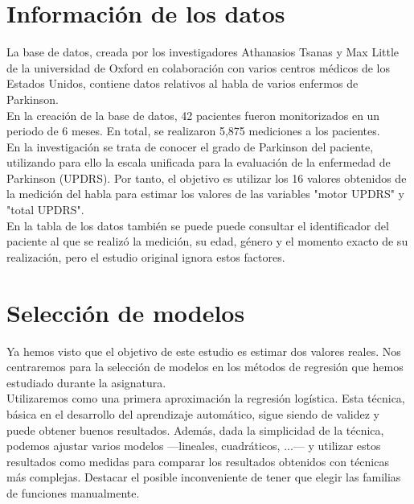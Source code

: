\section{Información de los datos}

La base de datos, creada por los investigadores Athanasios Tsanas y Max Little de la universidad de Oxford en colaboración con varios centros médicos de los Estados Unidos, contiene datos relativos al habla de varios enfermos de Parkinson.\\

En la creación de la base de datos, 42 pacientes fueron monitorizados en un periodo de 6 meses. En total, se realizaron 5,875 mediciones a los pacientes.\\

En la investigación se trata de conocer el grado de Parkinson del paciente, utilizando para ello la escala unificada para la evaluación de la enfermedad de Parkinson (UPDRS). Por tanto, el objetivo es utilizar los 16 valores obtenidos de la medición del habla para estimar los valores de las variables "motor UPDRS" y "total UPDRS".\\

En la tabla de los datos también se puede puede consultar el identificador del paciente al que se realizó la medición, su edad, género y el momento exacto de su realización, pero el estudio original ignora estos factores.\\

\section{Selección de modelos}

Ya hemos visto que el objetivo de este estudio es estimar dos valores reales. Nos centraremos para la selección de modelos en los métodos de regresión que hemos estudiado durante la asignatura.\\

Utilizaremos como una primera aproximación la regresión logística. Esta técnica, básica en el desarrollo del aprendizaje automático, sigue siendo de validez y puede obtener buenos resultados. Además, dada la simplicidad de la técnica, podemos ajustar varios modelos ---lineales, cuadráticos, ...--- y utilizar estos resultados como medidas para comparar los resultados obtenidos con técnicas más complejas. Destacar el posible inconveniente de tener que elegir las familias de funciones manualmente.\\

